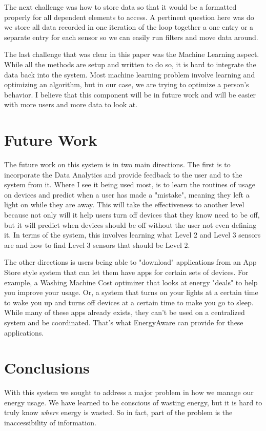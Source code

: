 \documentclass{sig-alternate-05-2015}
\begin{document}
The next challenge was how to store data so that it would be a formatted properly for all dependent elements to access. A pertinent question here was do we store all data recorded in one iteration of the loop together a one entry or a separate entry for each sensor so we can easily run filters and move data around.

The last challenge that was clear in this paper was the Machine Learning aspect. While all the methods are setup and written to do so, it is hard to integrate the data back into the system. Most machine learning problem involve learning and optimizing an algorithm, but in our case, we are trying to optimize a person's behavior. I believe that this component will be in future work and will be easier with more users and more data to look at.

\section{Future Work}
The future work on this system is in two main directions. The first is to incorporate the Data Analytics and provide feedback to the user and to the system from it. Where I see it being used most, is to learn the routines of usage on devices and predict when a user has made a "mistake", meaning they left a light on while they are away. This will take the effectiveness to another level because not only will it help users turn off devices that they know need to be off, but it will predict when devices should be off without the user not even defining it. In terms of the system, this involves learning what Level 2 and Level 3 sensors are and how to find Level 3 sensors that should be Level 2.

The other directions is users being able to "download" applications from an App Store style system that can let them have apps for certain sets of devices. For example, a Washing Machine Cost optimizer that looks at energy "deals" to help you improve your usage. Or, a system that turns on your lights at a certain time to wake you up and turns off devices at a certain time to make you go to sleep. While many of these apps already exists, they can't be used on a centralized system and be coordinated. That's what EnergyAware can provide for these applications.
\section{Conclusions}
With this system we sought to address a major problem in how we manage our energy usage. We have learned to be conscious of wasting energy, but it is hard to truly know \textit{where} energy is wasted. So in fact, part of the problem is the inaccessibility of information.
\end{document}
